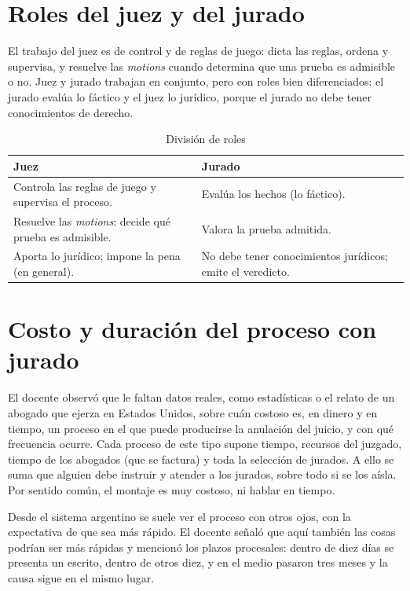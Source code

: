 \documentclass[12pt,oneside]{book}
\begin{document}
\section{Roles del juez y del jurado}

El trabajo del juez es de control y de reglas de juego: dicta las reglas, ordena y supervisa, y resuelve las \textit{motions} cuando determina que una prueba es admisible o no. Juez y jurado trabajan en conjunto, pero con roles bien diferenciados: el jurado evalúa lo fáctico y el juez lo jurídico, porque el jurado no debe tener conocimientos de derecho.

\begin{table}[H]
\centering
\small
\caption{División de roles}
\begin{tabularx}{\textwidth}{L L}
\toprule
\textbf{Juez} & \textbf{Jurado} \\
\midrule
Controla las reglas de juego y supervisa el proceso. & Evalúa los hechos (lo fáctico). \\
\addlinespace
Resuelve las \textit{motions}: decide qué prueba es admisible. & Valora la prueba admitida. \\
\addlinespace
Aporta lo jurídico; impone la pena (en general). & No debe tener conocimientos jurídicos; emite el veredicto. \\
\bottomrule
\end{tabularx}
\end{table}

\section{Costo y duración del proceso con jurado}

El docente observó que le faltan datos reales, como estadísticas o el relato de un abogado que ejerza en Estados Unidos, sobre cuán costoso es, en dinero y en tiempo, un proceso en el que puede producirse la anulación del juicio, y con qué frecuencia ocurre. Cada proceso de este tipo supone tiempo, recursos del juzgado, tiempo de los abogados (que se factura) y toda la selección de jurados. A ello se suma que alguien debe instruir y atender a los jurados, sobre todo si se los aísla. Por sentido común, el montaje es muy costoso, ni hablar en tiempo.

Desde el sistema argentino se suele ver el proceso con otros ojos, con la expectativa de que sea más rápido. El docente señaló que aquí también las cosas podrían ser más rápidas y mencionó los plazos procesales: dentro de diez días se presenta un escrito, dentro de otros diez, y en el medio pasaron tres meses y la causa sigue en el mismo lugar.
\end{document}
